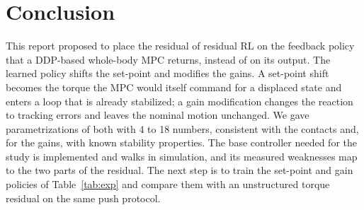\documentclass[conference]{IEEEtran}
\begin{document}
\section{Conclusion}
This report proposed to place the residual of residual RL on the feedback policy that a DDP-based whole-body MPC returns, instead of on its output.
The learned policy shifts the set-point and modifies the gains.
A set-point shift becomes the torque the MPC would itself command for a displaced state and enters a loop that is already stabilized; a gain modification changes the reaction to tracking errors and leaves the nominal motion unchanged.
We gave parametrizations of both with 4 to 18 numbers, consistent with the contacts and, for the gains, with known stability properties.
The base controller needed for the study is implemented and walks in simulation, and its measured weaknesses map to the two parts of the residual.
The next step is to train the set-point and gain policies of Table~\ref{tab:exp} and compare them with an unstructured torque residual on the same push protocol.



\end{document}
